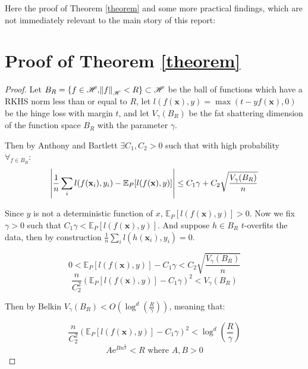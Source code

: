 

\appendix
\appendixpage


Here the proof of Theorem \ref{theorem} and some more practical findings, which are not immediately relevant to the main story of this report:

\section{Proof of Theorem \ref{theorem}} \label{proof}

\begin{proof}
Let $B_R = \{f \in \mathscr{H}, \norm{f}_{\mathscr{H}} < R\} \subset \mathscr{H}$ be the ball of functions which have a RKHS norm less than or equal to $R$, let $l(f(\mathbf{x}), y) = \max(t - y f(\mathbf{x}), 0)$ be the hinge loss with margin $t$, and let $V_{\gamma}(B_R)$ be the fat shattering dimension of the function space $B_R$ with the parameter $\gamma$.

Then by Anthony and Bartlett \cite{bartlett2002} $\exists C_1, C_2 > 0$ such that with high probability $\forall_{f \in B_R}$:
\begin{equation}
    \abs{ \frac{1}{n} \sum_i l(f(\mathbf{x}_i), y_i) - \mathbb{E}_P[l(f(\mathbf{x}), y)] } \leq C_1 \gamma + C_2 \sqrt{\frac{V_{\gamma}(B_R)}{n}}
\end{equation}

Since $y$ is not a deterministic function of $x$, $\mathbb{E}_P[l(f(\mathbf{x}), y)] > 0$. Now we fix $\gamma > 0$ such that $C_1 \gamma < \mathbb{E}_P[l(f(\mathbf{x}), y)]$. And suppose $h \in B_R$ $t$-overfits the data, then by construction $\frac{1}{n} \sum_i l(h(\mathbf{x}_i), y_i) = 0$.

\begin{equation}
     0 < \mathbb{E}_P[l(f(\mathbf{x}), y)] - C_1 \gamma <  C_2 \sqrt{\frac{V_{\gamma}(B_R)}{n}}
\end{equation}
\begin{equation}
    \frac{n}{C_2^2}(\mathbb{E}_P[l(f(\mathbf{x}), y)] - C_1 \gamma)^2 <  V_{\gamma}(B_R)
\end{equation}

Then by Belkin \cite{belkin2018b} $V_{\gamma}(B_R) < O(\log^d(\frac{R}{\gamma}))$, meaning that:

\begin{equation}
    \frac{n}{C_2^2}(\mathbb{E}_P[l(f(\mathbf{x}), y)] - C_1 \gamma)^2 < \log^d(\frac{R}{\gamma})
\end{equation}
\begin{equation}
     A \mathrm{e}^{B n^\frac{1}{d}} < R \mbox{ where } A, B > 0
\end{equation}

\end{proof}




